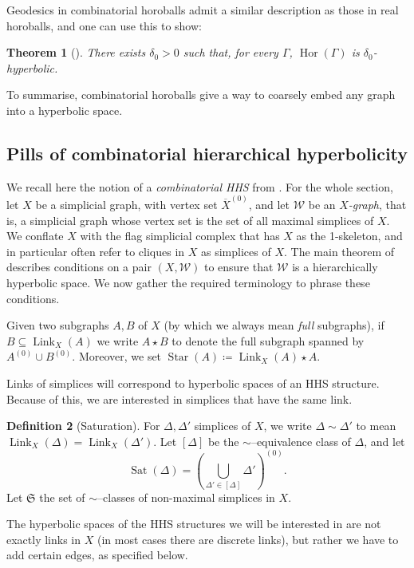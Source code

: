 \documentclass[svgnames]{amsart}
\theoremstyle{plain}
\newtheorem{thm}{Theorem}[section]
\theoremstyle{definition}
\newtheorem{defn}[thm]{Definition}
\newcommand{\frakS}{\mathfrak S}
\newcommand{\link}[2]{\operatorname{Link}_{#1}\left(#2\right)}
\newcommand{\W}{\mathcal{W}}
\newcommand{\Sat}{\operatorname{Sat}}
\newcommand{\CStar}[1]{\operatorname{Star}\left(#1\right)}
\newcommand{\Hor}[1]{\operatorname{Hor}\left(#1\right)}
\newcommand{\ov}[1]{\overline{#1}}
\begin{document}
\noindent  Geodesics in combinatorial horoballs admit a similar description as those in real horoballs, and one can use this to show:

\begin{thm}[{\cite{GrovesManning}}]\label{thm:horgamma_hyp}
There exists $\delta_0>0$ such that, for every $\Gamma$, $\Hor{\Gamma}$ is $\delta_0$-hyperbolic.
\end{thm}

\noindent To summarise, combinatorial horoballs give a way to coarsely embed any graph into a hyperbolic space.



\subsection{Pills of combinatorial hierarchical hyperbolicity} We recall here the notion of a \emph{combinatorial HHS} from \cite{BHMS}. For the whole section, let $X$ be a simplicial graph, with vertex set $\ov X^{(0)}$, and let $\W$ be an \emph{$X$-graph}, that is, a simplicial graph whose vertex set is the set of all maximal simplices of $X$. We conflate $X$ with the flag simplicial complex that has $X$ as the 1-skeleton, and in particular often refer to cliques in $X$ as simplices of $X$. The main theorem of \cite{BHMS} describes conditions on a pair $(X,\W)$ to ensure that $\W$ is a hierarchically hyperbolic space. We now gather the required terminology to phrase these conditions.

Given two subgraphs $A,B$ of $X$ (by which we always mean \emph{full} subgraphs), if $B\subseteq \link{X}{A}$ we write $A\star B$ to denote the full subgraph spanned by $A^{(0)}\cup B^{(0)}$. Moreover, we set $\CStar{A}\coloneq \link{X}{A}\star A$. 


Links of simplices will correspond to hyperbolic spaces of an HHS structure. Because of this, we are interested in simplices that have the same link.


\begin{defn}[Saturation]\label{defn:simplex_equivalence}
For $\Delta,\Delta'$ simplices of $X$, we write $\Delta\sim\Delta'$ to mean $\link{X}{\Delta}=\link{X}{\Delta'}$. Let $[\Delta]$ be the $\sim$--equivalence class of $\Delta$, and let 
$$\Sat(\Delta)=\left(\bigcup_{\Delta'\in[\Delta]}\Delta'\right)^{(0)}.$$
Let $\frakS$ the set of $\sim$--classes of non-maximal simplices in $X$. 
\end{defn}


The hyperbolic spaces of the HHS structures we will be interested in are not exactly links in $X$ (in most cases there are discrete links), but rather we have to add certain edges, as specified below.
\end{document}
